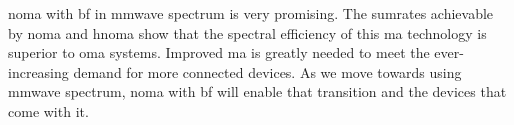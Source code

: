 \par
\ac{noma} with \ac{bf} in \ac{mmwave} spectrum is very promising.
The sumrates achievable by \ac{noma} and \ac{hnoma} show that the spectral efficiency of this \ac{ma} technology is superior to \ac{oma} systems.
Improved \ac{ma} is greatly needed to meet the ever-increasing demand for more connected devices. 
As we move towards using \ac{mmwave} spectrum, \ac{noma} with \ac{bf} will enable that transition and the devices that come with it.

